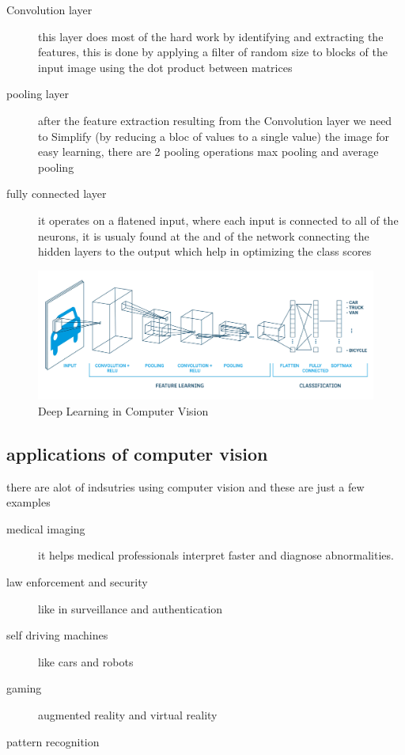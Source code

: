         \begin{description}
        \item[Convolution layer]
            this layer does most of the hard work by identifying and extracting the features, this is done by applying a filter of random size to blocks of the input image using the dot product between matrices
        \item[pooling layer] 
            after the feature extraction resulting from the Convolution layer we need to Simplify (by reducing a bloc of values to a single value) the image for easy learning, there are 2 pooling operations max pooling and average pooling 
        \item[fully connected layer]
            it operates on a flatened input, where each input is connected to all of the neurons, it is usualy found at the and of the network connecting the hidden layers to the output which help in optimizing the class scores
        \end{description}
        \begin{figure}[htbp]
        \begin{center}
        \includegraphics[width=15cm]{./chapter-02-general-ai-information/cnn.png}
        \end{center}
        \caption{Deep Learning in Computer Vision ~\cite{mldlcv}}
        \label{fig:mldlcv}
        \end{figure}
    

    \subsection{applications of computer vision}
        there are alot of indsutries using computer vision and these are just a few examples  ~\cite{mldlcv}
        \begin{description}
        \item[medical imaging] 
            it helps medical professionals interpret faster and diagnose abnormalities.
        \item[law enforcement and security]
            like in surveillance and authentication
        \item[self driving machines] like cars and robots
        \item[gaming] augmented reality and virtual reality
        \item[pattern recognition]
        \end{description}

